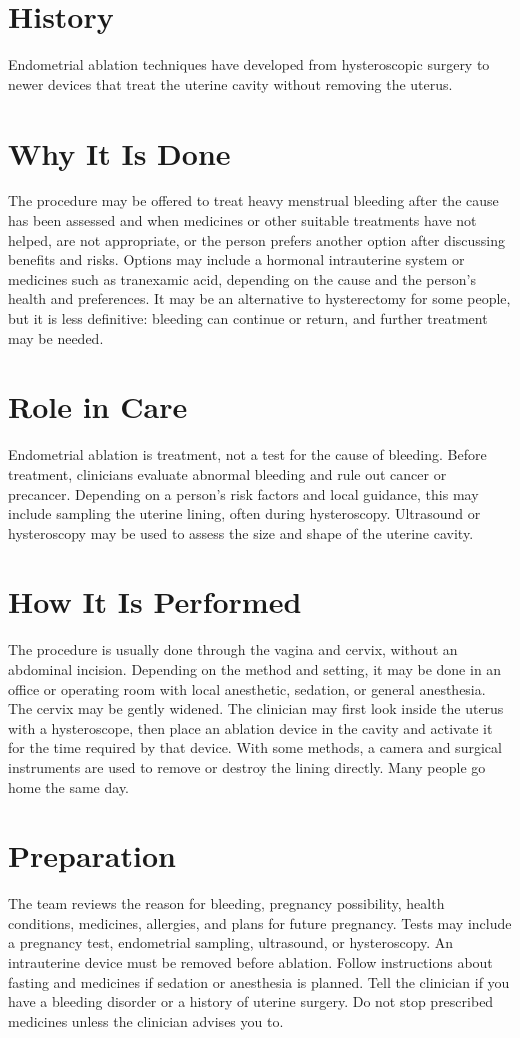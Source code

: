 \section*{History}
Endometrial ablation techniques have developed from hysteroscopic surgery to newer devices that treat the uterine cavity without removing the uterus.

\section*{Why It Is Done}
The procedure may be offered to treat heavy menstrual bleeding after the cause has been assessed and when medicines or other suitable treatments have not helped, are not appropriate, or the person prefers another option after discussing benefits and risks. Options may include a hormonal intrauterine system or medicines such as tranexamic acid, depending on the cause and the person's health and preferences. It may be an alternative to hysterectomy for some people, but it is less definitive: bleeding can continue or return, and further treatment may be needed.

\section*{Role in Care}
Endometrial ablation is treatment, not a test for the cause of bleeding. Before treatment, clinicians evaluate abnormal bleeding and rule out cancer or precancer. Depending on a person's risk factors and local guidance, this may include sampling the uterine lining, often during hysteroscopy. Ultrasound or hysteroscopy may be used to assess the size and shape of the uterine cavity.

\section*{How It Is Performed}
The procedure is usually done through the vagina and cervix, without an abdominal incision. Depending on the method and setting, it may be done in an office or operating room with local anesthetic, sedation, or general anesthesia. The cervix may be gently widened. The clinician may first look inside the uterus with a hysteroscope, then place an ablation device in the cavity and activate it for the time required by that device. With some methods, a camera and surgical instruments are used to remove or destroy the lining directly. Many people go home the same day.

\section*{Preparation}
The team reviews the reason for bleeding, pregnancy possibility, health conditions, medicines, allergies, and plans for future pregnancy. Tests may include a pregnancy test, endometrial sampling, ultrasound, or hysteroscopy. An intrauterine device must be removed before ablation. Follow instructions about fasting and medicines if sedation or anesthesia is planned. Tell the clinician if you have a bleeding disorder or a history of uterine surgery. Do not stop prescribed medicines unless the clinician advises you to.

